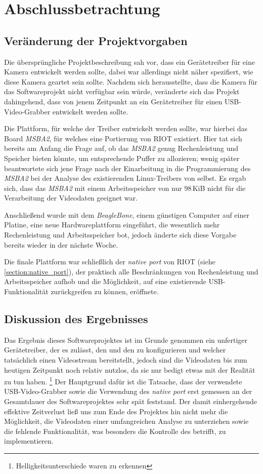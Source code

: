 \section{Abschlussbetrachtung}

\subsection{Veränderung der Projektvorgaben}
Die übersprüngliche Projektbeschreibung sah vor, dass ein Gerätetreiber für eine Kamera entwickelt werden sollte, dabei war allerdings nicht näher spezifiert, wie diese Kamera geartet sein sollte.
Nachdem sich herausstellte, dass die Kamera für das Softwareprojekt nicht verfügbar sein würde, veränderte sich das Projekt dahingehend, dass von jenem Zeitpunkt an ein Gerätetreiber für einen USB-Video-Grabber entwickelt werden sollte.

Die Plattform, für welche der Treiber entwickelt werden sollte, war hierbei das Board \emph{MSBA2}, für welches eine Portierung von RIOT existiert.
Hier tat sich bereits am Anfang die Frage auf, ob das \emph{MSBA2} genug Rechenleistung und Speicher bieten könnte, um entsprechende Puffer zu allozieren; wenig später beantwortete sich jene Frage nach der Einarbeitung in die Programmierung des \emph{MSBA2} bei der Analyse des existierenden Linux-Treibers von selbst.
Es ergab sich, dass das \emph{MSBA2} mit einem Arbeitsspeicher von nur 98\,KiB nicht für die Verarbeitung der Videodaten geeignet war.

Anschließend wurde mit dem \emph{BeagleBone}, einem günstigen Computer auf einer Platine, eine neue Hardwareplattform eingeführt, die wesentlich mehr Rechenleistung und Arbeitsspeicher bot, jedoch änderte sich diese Vorgabe bereits wieder in der nächste Woche.

Die finale Plattform war schließlich der \emph{native port} von RIOT (siehe \autoref{section:native_port}), der praktisch alle Beschränkungen von Rechenleistung und Arbeitsspeicher aufhob und die Möglichkeit, auf eine existierende USB-Funktionalität zurückgreifen zu können, eröffnete.

\subsection{Diskussion des Ergebnisses}
Das Ergebnis dieses Softwareprojektes ist im Grunde genommen ein unfertiger Gerätetreiber, der es zulässt, den \stk{} und den \saa{} zu konfigurieren und welcher tatsächlich einen Videostream bereitstellt, jedoch sind die Videodaten bis zum heutigen Zeitpunkt noch relativ nutzlos, da sie nur bedigt etwas mit der Realität zu tun haben.
\footnote{Helligkeitsunterschiede waren zu erkennen}
Der Hauptgrund dafür ist die Tatsache, dass der verwendete USB-Video-Grabber sowie die Verwendung des \emph{native port} erst gemessen an der Gesamtdauer des Softwareprojektes sehr spät feststand.
Der damit einhergehende effektive Zeitverlust ließ uns zum Ende des Projektes hin nicht mehr die Möglichkeit, die Videodaten einer umfangreichen Analyse zu unterziehen sowie die fehlende Funktionalität, was besonders die Kontrolle des \saa{} betrifft, zu implementieren.

